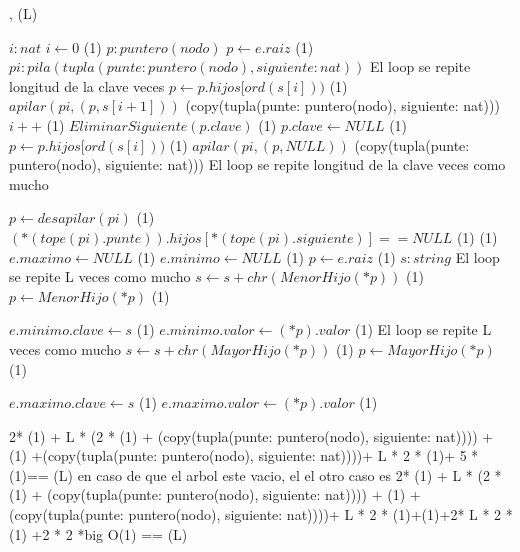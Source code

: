 {   ,
    }
    {}
    {\bigo(L)}
{
	\var $i : nat$
	\State $ i \gets 0$  												\comment \bigo(1) 
	\var $p : puntero(nodo)$ 
	\State $ p \gets e.raiz$											\comment \bigo(1)  
	\var $pi: pila(tupla(punte: puntero(nodo), siguiente: nat))$ 
     	\Statex             \comment El loop se repite longitud de la clave veces
     	\State $p \gets p.hijos[ord(s[i]))$								\comment \bigo(1)
     	\State $apilar(pi, (p,s[i+1])) $								\comment \bigo(copy(tupla(punte: puntero(nodo), siguiente: nat))) 
     	\State $i++$   													\comment \bigo(1) 
    \EndWhile	
    \State $EliminarSiguiente(p.clave)$            \comment \bigo(1)
    \State $p.clave \gets NULL$               \comment \bigo(1)
    \State $p \gets p.hijos[ord(s[i]))$								\comment \bigo(1)
     \State $apilar(pi, (p,NULL)) $							\comment \bigo(copy(tupla(punte: puntero(nodo), siguiente: nat)))	
     	\Statex             \comment El loop se repite longitud de la clave veces como mucho
 
     	\State $p \gets desapilar(pi)$								\comment \bigo(1)
     	  \State $(*(tope(pi).punte)).hijos[*(tope(pi).siguiente)] == NULL$							\comment \bigo(1)	
    \EndWhile	
                         			\comment \bigo(1)
		 	\State $e.maximo \gets NULL$							\comment \bigo(1)
	\State $e.minimo \gets NULL$							\comment \bigo(1)
	\Else
         \State $ p \gets e.raiz$	\comment \bigo(1)
         \var $s : string$ 
     		\Statex             \comment El loop se repite L veces como mucho
     		\State $s \gets s+chr(MenorHijo(*p))$								\comment \bigo(1)	
     		\State $p \gets MenorHijo(*p)$								\comment \bigo(1)	
     				
    	\EndWhile		
    	\State $e.minimo.clave \gets s$								\comment \bigo(1)	
    	\State $e.minimo.valor \gets (*p).valor$								\comment \bigo(1)	
     		\Statex             \comment El loop se repite L veces como mucho
     		\State $s \gets s+chr(MayorHijo(*p))$								\comment \bigo(1)	
     		\State $p \gets MayorHijo(*p)$								\comment \bigo(1)	
     				
    	\EndWhile		
    	\State $e.maximo.clave \gets s$								\comment \bigo(1)	
    	\State $e.maximo.valor \gets (*p).valor$								\comment \bigo(1)	
    	
     \EndIf
												 

}	{  2* \bigo(1) + L * (2 * \bigo(1) + \bigo(copy(tupla(punte: puntero(nodo), siguiente: nat)))) + \bigo(1) +\bigo(copy(tupla(punte: puntero(nodo), siguiente: nat))))+ L * 2 * \bigo(1)+ 5 * \bigo(1)== \bigo(L) en caso de que el arbol este vacio, el el otro caso es 
2* \bigo(1) + L * (2 * \bigo(1) + \bigo(copy(tupla(punte: puntero(nodo), siguiente: nat)))) + \bigo(1) +\bigo(copy(tupla(punte: puntero(nodo), siguiente: nat))))+ L * 2 * \bigo(1)+\bigo(1)+2* L * 2 * \bigo(1) +2 * 2 *big O(1) == \bigo(L)}

